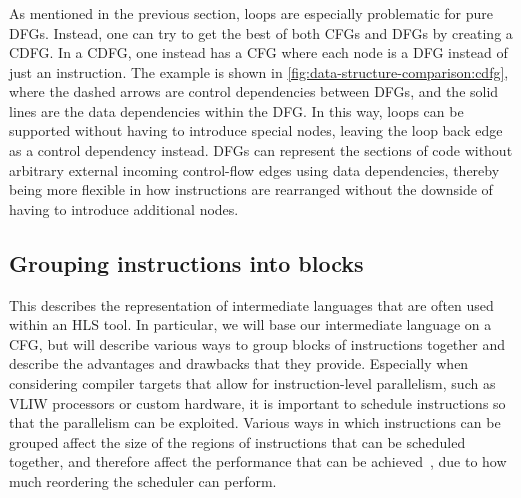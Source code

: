 \subsubsection{}

As mentioned in the previous section, loops are especially problematic for pure
\glspl{DFG}.  Instead, one can try to get the best of both \glspl{CFG} and
\glspl{DFG} by creating a \gls{CDFG}.  In a \gls{CDFG}, one instead has a
\gls{CFG} where each node is a \gls{DFG} instead of just an instruction.  The
example is shown in \cref{fig:data-structure-comparison:cdfg}, where the dashed
arrows are control dependencies between \glspl{DFG}, and the solid lines are the
data dependencies within the \gls{DFG}.  In this way, loops can be supported
without having to introduce special nodes, leaving the loop back edge as a
control dependency instead. \Glspl{DFG} can represent the sections of code
without arbitrary external incoming control-flow edges using data
dependencies, thereby being more flexible in how instructions are rearranged
without the downside of having to introduce additional nodes.

\subsection{Grouping instructions into blocks}%
\label{sec:bg:intermediate-language}

This  describes the representation of
intermediate languages that are often used within an \gls{HLS} tool.  In
particular, we will base our intermediate language on a \gls{CFG}, but will
describe various ways to group blocks of instructions together and describe the
advantages and drawbacks that they provide.  Especially when considering
compiler targets that allow for instruction-level parallelism, such as
\gls{VLIW} processors or custom hardware, it is important to schedule
instructions so that the parallelism can be exploited.  Various ways in which
instructions can be grouped affect the size of the regions of instructions that
can be scheduled together, and therefore affect the performance that can be
achieved~\cite{faraboschi01_isilpp}, due to how much reordering the scheduler
can perform.

